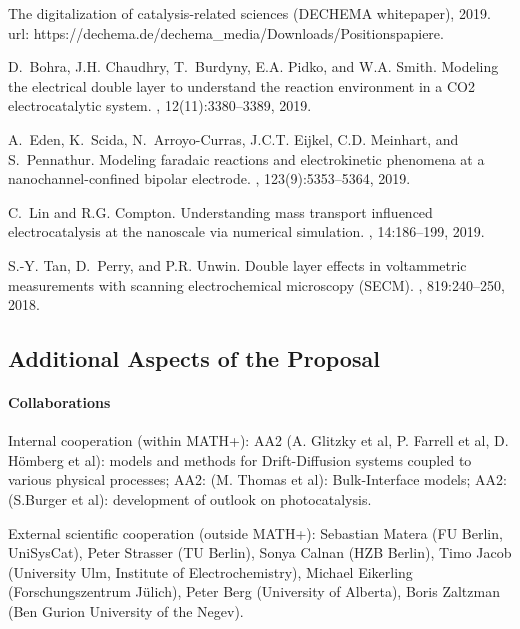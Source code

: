 \documentclass[a4paper,10pt]{article}
\begin{document}
{\begin{thebibliography}{1}
The digitalization of catalysis-related sciences ({DECHEMA} whitepaper), 2019.
\newblock url: {https://dechema.de/dechema\_media/Downloads/Positionspapiere}.

D.~Bohra, J.H. Chaudhry, T.~Burdyny, E.A. Pidko, and W.A. Smith.
\newblock Modeling the electrical double layer to understand the reaction
  environment in a CO2 electrocatalytic system.
, 12(11):3380--3389, 2019.

A.~Eden, K.~Scida, N.~Arroyo-Curras, J.C.T. Eijkel, C.D. Meinhart, and
  S.~Pennathur.
\newblock Modeling faradaic reactions and electrokinetic phenomena at a
  nanochannel-confined bipolar electrode.
, 123(9):5353--5364, 2019.

C.~Lin and R.G. Compton.
\newblock Understanding mass transport influenced electrocatalysis at the
  nanoscale via numerical simulation.
, 14:186--199, 2019.

S.-Y. Tan, D.~Perry, and P.R. Unwin.
\newblock Double layer effects in voltammetric measurements with scanning
  electrochemical microscopy (SECM).
, 819:240--250, 2018.

\end{thebibliography}

}

\subsection*{Additional Aspects of the Proposal}

\paragraph{Collaborations}
Internal cooperation (within MATH+):
AA2 (A. Glitzky  et al, P. Farrell et al, D. Hömberg et al): models and methods for Drift-Diffusion systems coupled
to various physical processes;
AA2: (M. Thomas et al): Bulk-Interface models;
AA2: (S.Burger et al): development of outlook on photocatalysis.

External scientific cooperation (outside MATH+):
Sebastian Matera (FU Berlin, UniSysCat),
Peter Strasser (TU Berlin),
Sonya Calnan (HZB Berlin),
Timo Jacob (University Ulm, Institute of Electrochemistry),
Michael Eikerling (Forschungszentrum Jülich),
Peter Berg (University of Alberta),
Boris Zaltzman (Ben Gurion University of the Negev).
\end{document}
